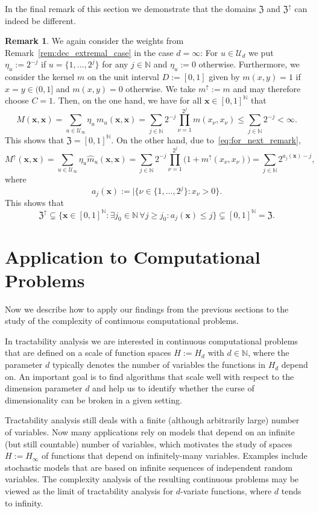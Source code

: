 \documentclass{article}
\newcommand{\N}  {{\mathbb N}}
\newcommand{\bx}{{\mathbf x}}
\newcommand{\Z}{{\mathfrak Z}}
\newcommand{\U}  {\mathcal{U}}
\newcommand{\up}{\uparrow}
\theoremstyle{plain}
\theoremstyle{definition}
\newtheorem{rem}{Remark}
\begin{document}
In the final remark of this section we demonstrate that the 
domains $\Z$ and $\Z^{\up}$ can indeed be different. 

\begin{rem}
We again consider the weights from 
Remark~\ref{rem:dec_extremal_case} in the case
$d=\infty$:
For $u \in \U_d$ we put $\eta_u := 2^{-j}$ if $u =
\{1,\dots,2^j\}$ for any $j \in \N$ and $\eta_u := 0$ otherwise.
Furthermore, we consider the kernel $m$ on the unit interval 
$D := [0,1]$ given by 
$m(x,y) = 1$ if $x=y\in (0,1]$ and $m(x,y) = 0$ 
otherwise. We take $m^{\up}:= m$
and may therefore choose $C=1$. 
Then, on the one hand, we have for all $\bx \in [0,1]^\N$ that
\[
M(\bx,\bx) 
= \sum_{u\in \U_\infty} \eta_u \, m_{u} (\bx,\bx) 
= \sum_{j\in \N} 2^{-j} \prod_{\nu =1}^{2^j}  m(x_\nu, x_\nu)
\le \sum_{j\in \N} 2^{-j} < \infty.
\]
This shows that $\Z = [0,1]^\N$.  On the other hand, 
due to~\eqref{eq:for_next_remark},
\[
M^{\up} (\bx,\bx) 
= \sum_{u\in \U_\infty} \eta_u \widehat{m}_u (\bx,\bx)
= \sum_{j\in \N} 2^{-j} \prod_{\nu =1}^{2^j} 
\big( 1 + m^{\up}(x_\nu, x_\nu) \big)
=  \sum_{j\in \N} 
2^{a_j(\bx)-j},
\]
where
\[
a_j(\bx) := | \{ \nu \in \{1,\dots,2^j\} : x_\nu > 0\}.
\]
This shows that 
\[
\Z^{\up} \subsetneq 
\{ \bx \in [0,1]^\N :
\exists  j_0 \in \N \, \forall j \ge j_0: 
a_j(\bx)
\le j\}
\subsetneq [0,1]^\N = \Z.
\]
\end{rem}


\section{Application to Computational Problems}%
\label{Sec:Application}

Now we describe how to apply our findings from the previous 
sections to the study of the complexity of continuous computational
problems.

In tractability analysis we are interested in continuous 
computational problems that are defined on a scale of function 
spaces $H := H_d$ with $d \in \N$, where the parameter
$d$ typically denotes the number of variables the functions in 
$H_d$ depend on. An important goal is to find algorithms that scale 
well with respect to the 
dimension parameter $d$ and help us to identify whether 
the curse of dimensionality can be broken in a given setting. 

Tractability analysis still deals with a finite (although 
arbitrarily large) number of variables. Now many applications 
rely on models that depend on an infinite (but still countable)
number of variables,
which motivates the study of spaces $H := H_\infty$ of functions
that depend on infinitely-many variables.
Examples include stochastic models that are based 
on infinite sequences of independent random variables.
The complexity analysis of the resulting continuous problems may 
be viewed as the limit of tractability analysis for 
$d$-variate functions, where $d$ tends to infinity.
\end{document}
